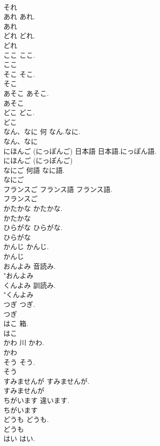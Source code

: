 \documentclass[8pt]{extreport}
\begin{document}
\begin{CJK}{UTF8}{min}
\\	それ
\\	あれ		あれ.	
\\	あれ
\\	どれ		どれ.	
\\	どれ
\\	ここ		ここ.	
\\	ここ
\\	そこ		そこ.	
\\	そこ
\\	あそこ		あそこ.	
\\	あそこ
\\	どこ		どこ.	
\\	どこ
\\	なん、なに	何	なん.なに.	
\\	なん、なに
\\	にほんご (にっぽんご)	日本語	日本語.にっぽん語.	
\\	にほんご (にっぽんご)
\\	なにご	何語	なに語.	
\\	なにご
\\	フランスご	フランス語	フランス語.	
\\	フランスご
\\	かたかな		かたかな.	
\\	かたかな
\\	ひらがな		ひらがな.	
\\	ひらがな
\\	かんじ		かんじ.	
\\	かんじ
\\	おんよみ		音読み.	
\\	"おんよみ
\\	くんよみ		訓読み.	
\\	"くんよみ
\\	つぎ		つぎ.	
\\	つぎ
\\	はこ		箱.	
\\	はこ
\\	かわ	川	かわ.	
\\	かわ
\\	そう		そう.	
\\	そう
\\	すみませんが		すみませんが.	
\\	すみませんが
\\	ちがいます		違います.	
\\	ちがいます
\\	どうも		どうも.	
\\	どうも
\\	はい		はい.	

\end{CJK}
\end{document}
